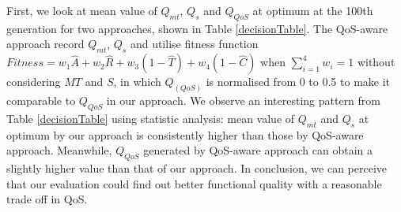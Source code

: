 \documentclass{IEEEtran}
\begin{document}
First, we look at mean value of $Q_{mt}$, $Q_{s}$ and $Q_{QoS}$ at optimum at the 100th generation for two approaches, shown in Table \ref{decisionTable}. The QoS-aware approach record $Q_{mt}$, $Q_{s}$ and utilise fitness function $Fitness = w_1 \hat{A} + w_2 \hat{R} + w_3(1 - \hat{T}) + w_4(1 - \hat{C})$ when $\sum_{i=1}^{4} w_i = 1$ without considering $MT$ and $S$, in which $Q_(QoS)$ is normalised from 0 to 0.5 to make it comparable to $Q_{QoS}$ in our approach. We observe an interesting pattern from Table \ref{decisionTable} using statistic analysis: mean value of $Q_{mt}$ and $Q_{s}$ at optimum by our approach is consistently higher than those by QoS-aware approach.  Meanwhile, $Q_{QoS}$ generated by QoS-aware approach can obtain a slightly higher value than that of our approach. In conclusion, we can perceive that our evaluation could find out better functional quality with a reasonable trade off in QoS.
\end{document}
